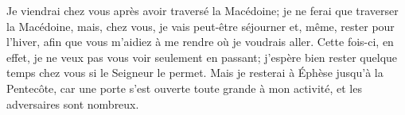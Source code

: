 Je viendrai chez vous après avoir traversé la Macédoine;
	je ne ferai que traverser la Macédoine,
	mais, chez vous, je vais peut-être séjourner et, même, rester pour l’hiver,
	afin que vous m’aidiez à me rendre où je voudrais aller.
Cette fois-ci, en effet, je ne veux pas vous voir seulement en passant;
	j’espère bien rester quelque temps chez vous si le Seigneur le permet.
Mais je resterai à Éphèse jusqu’à la Pentecôte,
	car une porte s’est ouverte toute grande à mon activité,
	et les adversaires sont nombreux.
